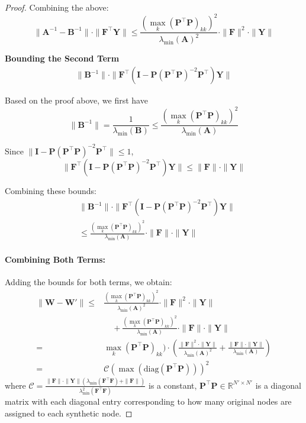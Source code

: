 \begin{proof}
Combining the above:
\[
\| \mathbf{A}^{-1} - \mathbf{B}^{-1} \| \cdot \| \mathbf{F}^\top \mathbf{Y} \| \leq \frac{(\max_k (\mathbf{P}^\top\mathbf{P})_{kk})^2}{\lambda_{\min}(\mathbf{A})^2} \cdot \| \mathbf{F} \|^2 \cdot \| \mathbf{Y} \|
\]


\textbf{Bounding the Second Term}
\begin{align*}
    \| \mathbf{B}^{-1} \| \cdot \| \mathbf{F}^\top (\mathbf{I} - \mathbf{P} (\mathbf{P}^\top\mathbf{P})^{-2} \mathbf{P}^\top) \mathbf{Y} \|
\end{align*}


Based on the proof above, we first have
\[
\| \mathbf{B}^{-1} \| = \frac{1}{\lambda_{\min}(\mathbf{B})} \leq \frac{(\max_k (\mathbf{P}^\top\mathbf{P})_{kk})^2}{\lambda_{\min}(\mathbf{A})}
\]

 Since \( \| \mathbf{I} - \mathbf{P} (\mathbf{P}^\top\mathbf{P})^{-2} \mathbf{P}^\top \| \leq 1 \), 
\[
\| \mathbf{F}^\top (\mathbf{I} - \mathbf{P} (\mathbf{P}^\top\mathbf{P})^{-2} \mathbf{P}^\top) \mathbf{Y} \| \leq \| \mathbf{F} \| \cdot \| \mathbf{Y} \|
\]

Combining these bounds:
\begin{align*}
        &\| \mathbf{B}^{-1} \| \cdot \| \mathbf{F}^\top (\mathbf{I} - \mathbf{P} (\mathbf{P}^\top\mathbf{P})^{-2} \mathbf{P}^\top) \mathbf{Y} \| \\
        &\leq \frac{(\max_k (\mathbf{P}^\top\mathbf{P})_{kk})^2}{\lambda_{\min}(\mathbf{A})} \cdot \| \mathbf{F} \| \cdot \| \mathbf{Y} \|
\end{align*}


\paragraph{Combining Both Terms:}
Adding the bounds for both terms, we obtain:
\begin{align*}
\| \mathbf{W} - \mathbf{W}' \| \leq & \frac{(\max_k (\mathbf{P}^\top\mathbf{P})_{kk})^2}{\lambda_{\min}(\mathbf{A})^2} \cdot \| \mathbf{F} \|^2 \cdot \| \mathbf{Y} \| \\
&\quad + \frac{(\max_k (\mathbf{P}^\top\mathbf{P})_{kk})^2}{\lambda_{\min}(\mathbf{A})} \cdot \| \mathbf{F} \| \cdot \| \mathbf{Y} \| \\
=&\max_k (\mathbf{P}^\top\mathbf{P})_{kk}) \cdot (\frac{\| \mathbf{F} \|^2 \cdot \| \mathbf{Y} \|}{\lambda_{\min}(\mathbf{A})^2} + \frac{\| \mathbf{F} \| \cdot \| \mathbf{Y} \|}{\lambda_{\min}(\mathbf{A})}) \\
=&\mathcal{C}(\max (\text{diag}(\mathbf{\mathbf{P}^\top\mathbf{P}})))^2
\end{align*}
where $\mathcal{C}=\frac{\|\mathbf{F} \| \cdot \| \mathbf{Y}\|({\lambda_{\min}(\mathbf{F}^\top\mathbf{F})}+\|\mathbf{F} \|)}{{\lambda^2_{\min}(\mathbf{F}^\top\mathbf{F})}}$ is a constant, $\mathbf{P}^\top\mathbf{P} \in \mathbb{R}^{N' \times N'}$ is a diagonal matrix with each diagonal entry corresponding to how many original nodes are assigned to each synthetic node. 


\end{proof}
